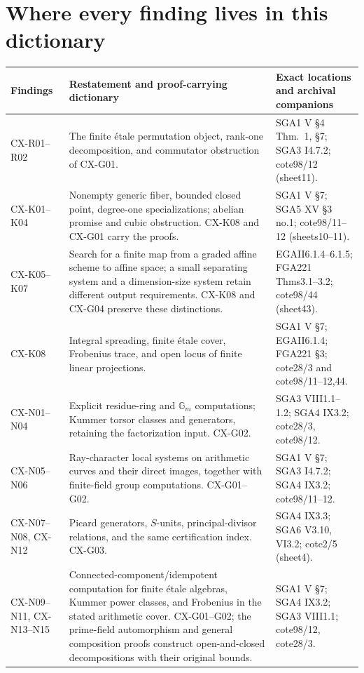 \section{Where every finding lives in this dictionary}
\label{sec:crosswalk}

\begin{longtable}{@{}p{}p{}p{}@{}}
\toprule
Findings & Restatement and proof-carrying dictionary & Exact locations and archival companions\\
\midrule
\endhead
CX-R01--R02 & The finite étale permutation object, rank-one decomposition, and commutator obstruction of CX-G01. & SGA1 V \S4 Thm.~1, \S7; SGA3 I4.7.2; cote98/12 (sheet11).\\
CX-K01--K04 & Nonempty generic fiber, bounded closed point, degree-one specializations; abelian promise and cubic obstruction. CX-K08 and CX-G01 carry the proofs. & SGA1 V \S7; SGA5 XV \S3 no.1; cote98/11--12 (sheets10--11).\\
CX-K05--K07 & Search for a finite map from a graded affine scheme to affine space; a small separating system and a dimension-size system retain different output requirements. CX-K08 and CX-G04 preserve these distinctions. & EGAII6.1.4--6.1.5; FGA221 Thms3.1--3.2; cote98/44 (sheet43).\\
CX-K08 & Integral spreading, finite étale cover, Frobenius trace, and open locus of finite linear projections. & SGA1 V \S7; EGAII6.1.4; FGA221 \S3; cote28/3 and cote98/11--12,44.\\
CX-N01--N04 & Explicit residue-ring and $\mathbb G_m$ computations; Kummer torsor classes and generators, retaining the factorization input. CX-G02. & SGA3 VIII1.1--1.2; SGA4 IX3.2; cote28/3, cote98/12.\\
CX-N05--N06 & Ray-character local systems on arithmetic curves and their direct images, together with finite-field group computations. CX-G01--G02. & SGA1 V \S7; SGA3 I4.7.2; SGA4 IX3.2; cote98/11--12.\\
CX-N07--N08, CX-N12 & Picard generators, $S$-units, principal-divisor relations, and the same certification index. CX-G03. & SGA4 IX3.3; SGA6 V3.10, VI3.2; cote2/5 (sheet4).\\
CX-N09--N11, CX-N13--N15 & Connected-component/idempotent computation for finite étale algebras, Kummer power classes, and Frobenius in the stated arithmetic cover. CX-G01--G02; the prime-field automorphism and general composition proofs construct open-and-closed decompositions with their original bounds. & SGA1 V \S7; SGA4 IX3.2; SGA3 VIII1.1; cote98/12, cote28/3.\\

\end{longtable}

